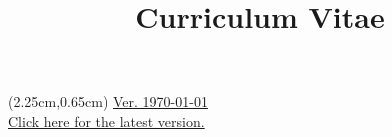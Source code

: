 \documentclass[a4paper,skipsamekey,11pt,english]{curve}
\title{Curriculum Vitae}
\begin{document}
\begin{textblock*}{14cm}(2.25cm,0.65cm) %
  \href{https://github.com/DT1000101/CV/releases/latest/download/Daniel_Turner_CV.pdf}{
    \scriptsize Ver. \today \\
    \scriptsize Click here for the latest version.
  }
\end{textblock*}

\makeheaders[c]


\pagebreak




\pagebreak


\end{document}
